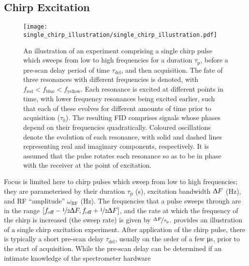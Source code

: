 \subsection{Chirp Excitation}
\begin{figure}
    \centering
    \texttt{[image: single\_chirp\_illustration/single\_chirp\_illustration.pdf]}
    \caption[
        The evolution of resonances of different frequencies during an
        experiment comprising a single chirp pulse.
    ]
    {
        An illustration of an experiment comprising a single chirp pulse \label{corr:ninty-flip} which sweeps from
        low to high frequencies for a duration $\tau_{\text{p}}$, before
        a pre-scan delay period of time $\tau_{\text{del}}$, and then
        acquisition. The fate of three resonances with different frequencies is
        denoted, with $f_{\text{red}} < f_{\text{blue}} <
        f_{\text{yellow}}$. Each resonance is excited at different points
        in time, with lower frequency resonances being excited earlier, such that
        each of these evolves for different amounts of time prior
        to acquisition ($\tau_0$).
        The resulting \ac{FID} comprises signals whose phases depend on their
        frequencies quadratically.
        Coloured oscillations denote the evolution of each resonance, with
        solid and dashed lines representing real and imaginary components,
        respectively. It is assumed that the pulse rotates each
        resonance so as to be in phase with the receiver at the point of
        excitation.
    }
    \label{fig:single-chirp}
\end{figure}
Focus is limited here to chirp pulses which sweep from low to high
frequencies; they are parameterised by
their duration $\tau_{\text{p}}$ (\unit{\second}),
excitation bandwidth $\Updelta F$ (\unit{\hertz}),
and \ac{RF} ``amplitude'' $\omega_{\text{RF}}$ (\unit{\hertz}).
The frequencies that a pulse sweeps through are in the range
$[f_{\text{off}} - \nicefrac{1}{2} \Updelta F,
f_{\text{off}} + \nicefrac{1}{2} \Updelta F]$,
and the rate at which the frequency of the chirp is increased (the sweep
rate) is given by $\nicefrac{\Updelta F}{\tau_{\text{p}}}$.
 provides an illustration of a single chirp
excitation experiment. After application of the chirp pulse, there is typically
a short pre-scan delay $\tau_{\text{del}}$, usually on the order of a few
\unit{\micro\second}, prior to the start of acquisition. While the pre-scan
delay can be determined if an intimate knowledge of the spectrometer hardware
